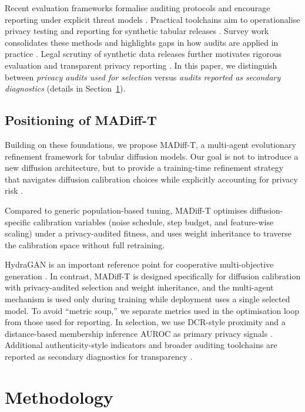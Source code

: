 \documentclass[preprint,12pt]{elsarticle}
\begin{document}
Recent evaluation frameworks formalise auditing protocols and encourage reporting under explicit threat models \cite{Hyrup2025}. Practical toolchains aim to operationalise privacy testing and reporting for synthetic tabular releases \cite{houssiau2022tapas}. Survey work consolidates these methods and highlights gaps in how audits are applied in practice \cite{hu2022membership_inference_survey}. Legal scrutiny of synthetic data releases further motivates rigorous evaluation and transparent privacy reporting \cite{Pilgram2025}. In this paper, we distinguish between \emph{privacy audits used for selection} versus \emph{audits reported as secondary diagnostics} (details in Section~\ref{sec:method}).

\subsection{Positioning of MADiff-T}\label{sec:rw_positioning}
Building on these foundations, we propose MADiff-T, a multi-agent evolutionary refinement framework for tabular diffusion models. Our goal is not to introduce a new diffusion architecture, but to provide a training-time refinement strategy that navigates diffusion calibration choices while explicitly accounting for privacy risk \cite{Hernandez2025}.

Compared to generic population-based tuning, MADiff-T optimises diffusion-specific calibration variables (noise schedule, step budget, and feature-wise scaling) under a privacy-audited fitness, and uses weight inheritance to traverse the calibration space without full retraining.

HydraGAN is an important reference point for cooperative multi-objective generation \cite{DeSmetCook2024}. In contrast, MADiff-T is designed specifically for diffusion calibration with privacy-audited selection and weight inheritance, and the multi-agent mechanism is used only during training while deployment uses a single selected model. To avoid ``metric soup,'' we separate metrics used in the optimisation loop from those used for reporting. In selection, we use DCR-style proximity and a distance-based membership inference AUROC as primary privacy signals \cite{yao2025dcr_delusion,Hayes2019,ZhangMalin2022}. Additional authenticity-style indicators and broader auditing toolchains are reported as secondary diagnostics for transparency \cite{Alaa2022,lautrup2025syntheval}.



\section{Methodology}
\label{sec:method}
\end{document}
